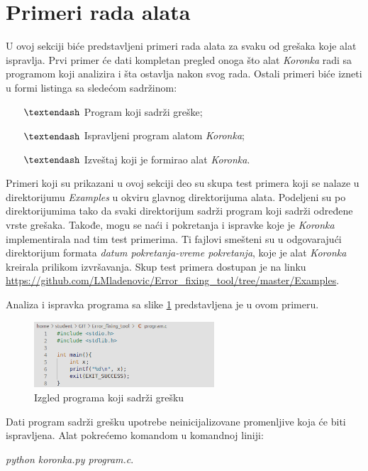 \documentclass[12pt,oneside]{memoir}
\theoremstyle{plain}
\theoremstyle{definition}
\begin{document}
\section{Primeri rada alata}
U ovoj sekciji biće predstavljeni primeri rada alata za svaku od grešaka koje alat ispravlja. Prvi primer će dati kompletan pregled onoga što alat \textit{Koronka} radi sa programom koji analizira i šta ostavlja nakon svog rada. Ostali primeri biće izneti u formi listinga sa sledećom sadržinom:
\begin{itemize}
\item[$\textendash$] Program koji sadrži greške;
\item[$\textendash$] Ispravljeni program alatom \textit{Koronka};
\item[$\textendash$] Izveštaj koji je formirao alat \textit{Koronka}.
\end{itemize} 

Primeri koji su prikazani u ovoj sekciji deo su skupa test primera koji se nalaze u direktorijumu \textit{Examples} u okviru glavnog direktorijuma alata. Podeljeni su po direktorijumima tako da svaki direktorijum sadrži program koji sadrži određene vrste grešaka. Takođe, mogu se naći i pokretanja i ispravke koje je \textit{Koronka} implementirala nad tim test primerima. Ti fajlovi smešteni su u odgovarajući direktorijum formata \textit{datum pokretanja-vreme pokretanja}, koje je alat \textit{Koronka} kreirala prilikom izvršavanja. Skup test primera dostupan je na linku \url{https://github.com/LMladenovic/Error_fixing_tool/tree/master/Examples}.  

Analiza i ispravka programa sa slike \ref{fig:slika4.15} predstavljena je u ovom primeru. 

\begin{figure}[!ht]
  \centering
  \includegraphics[width=0.6\textwidth]{ProgramWithError.png}
  \caption{Izgled programa koji sadrži grešku}
  \label{fig:slika4.15}
\end{figure}

Dati program sadrži grešku upotrebe neinicijalizovane promenljive koja će biti ispravljena. Alat pokrećemo komandom u komandnoj liniji:
\begin{center}
\textit{python koronka.py program.c}.
\end{center}
\end{document}
